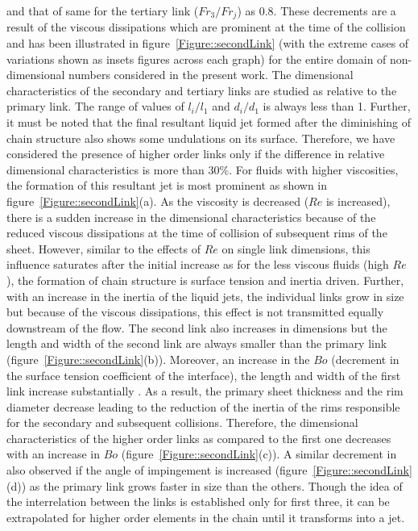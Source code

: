 \documentclass[%
 aip,
 sd,%
amsmath,amssymb,
preprint,%
author-year,%
]{revtex4-1}
\begin{document}
and that of same for the tertiary link ($Fr_3/Fr_j$) as 0.8. These decrements are a result of the viscous dissipations which are prominent at the time of the collision and has been illustrated in figure~\ref{Figure::secondLink} (with the extreme cases of variations shown as insets figures across each graph) for the entire domain of non-dimensional numbers considered in the present work. The dimensional characteristics of the secondary and tertiary links are studied as relative to the primary link. The range of values of $l_i/l_1$ and $d_i/d_1$ is always less than 1. Further, it must be noted that the final resultant liquid jet formed after the diminishing of chain structure also shows some undulations on its surface. Therefore, we have considered the presence of higher order links only if the difference in relative dimensional characteristics is more than 30$\%$. For fluids with higher viscosities, the formation of this resultant jet is most prominent as shown in figure~\ref{Figure::secondLink}(a). As the viscosity is decreased ($Re$ is increased), there is a sudden increase in the dimensional characteristics because of the reduced viscous dissipations at the time of collision of subsequent rims of the sheet. However, similar to the effects of $Re$ on single link dimensions, this influence saturates after the initial increase as for the less viscous fluids (high $Re$), the formation of chain structure is surface tension and inertia driven. Further, with an increase in the inertia of the liquid jets, the individual links grow in size but because of the viscous dissipations, this effect is not transmitted equally downstream of the flow. The second link also increases in dimensions but the length and width of the second link are always smaller than the primary link (figure~\ref{Figure::secondLink}(b)). Moreover, an increase in the $Bo$ (decrement in the surface tension coefficient of the interface), the length and width of the first link increase substantially \citep{yang2014liquid,bremond2006atomization}. As a result, the primary sheet thickness and the rim diameter decrease leading to the reduction of the inertia of the rims responsible for the secondary and subsequent collisions. Therefore, the dimensional characteristics of the higher order links as compared to the first one decreases with an increase in $Bo$ (figure~\ref{Figure::secondLink}(c)). A similar decrement in also observed if the angle of impingement is increased (figure~\ref{Figure::secondLink}(d)) as the primary link grows faster in size than the others. Though the idea of the interrelation between the links is established only for first three, it can be extrapolated for higher order elements in the chain until it transforms into a jet.
\end{document}
